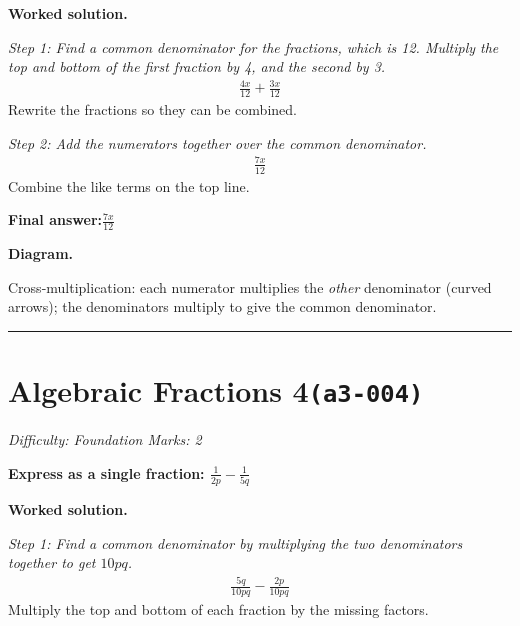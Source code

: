 \documentclass[11pt]{article}
\newcommand{\question}[1]{\par\medskip\noindent\textbf{#1}\par}
\begin{document}
\textbf{Worked solution.}

\textit{Step 1: Find a common denominator for the fractions, which is 12. Multiply the top and bottom of the first fraction by 4, and the second by 3.}
\[\begin{gathered}
\frac{4x}{12} + \frac{3x}{12}
\end{gathered}\]
Rewrite the fractions so they can be combined.

\textit{Step 2: Add the numerators together over the common denominator.}
\[\begin{gathered}
\frac{7x}{12}
\end{gathered}\]
Combine the like terms on the top line.

\begin{answerbox}
\textbf{Final answer:}\quad \(\displaystyle \frac{7x}{12}\)
\end{answerbox}
\textbf{Diagram.}

\begin{center}
\end{center}
\small Cross-multiplication: each numerator multiplies the \emph{other} denominator (curved arrows); the denominators multiply to give the common denominator.\normalsize

\medskip\hrule

\section*{Algebraic Fractions 4\quad\small\texttt{(a3-004)}}
\textit{Difficulty: Foundation \quad\textbar\quad Marks: 2}

\question{Express as a single fraction: \( \frac{1}{2p} - \frac{1}{5q} \)}

\textbf{Worked solution.}

\textit{Step 1: Find a common denominator by multiplying the two denominators together to get \( 10pq \).}
\[\begin{gathered}
\frac{5q}{10pq} - \frac{2p}{10pq}
\end{gathered}\]
Multiply the top and bottom of each fraction by the missing factors.
\end{document}
